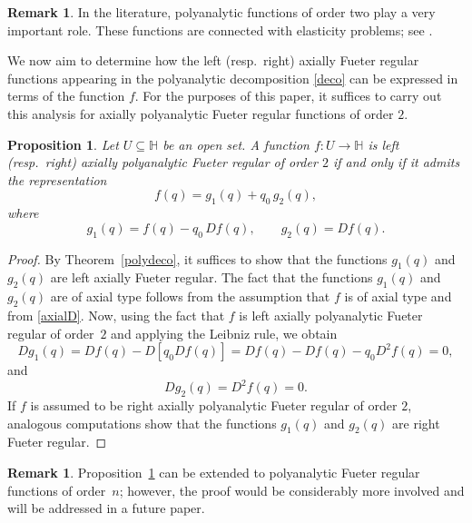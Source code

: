 \documentclass[reqno,11pt]{amsart}
\numberwithin{equation}{section}
\newtheorem{proposition}[theorem]{Proposition}
\theoremstyle{definition}
\newtheorem{remark}[theorem]{{\bf Remark}}
\begin{document}
\begin{remark}
In the literature, polyanalytic functions of order two play a very important role. These functions are connected with elasticity problems; see \cite{K1, M1}.
\end{remark}


We now aim to determine how the left (resp.\ right) axially Fueter regular functions appearing in the polyanalytic decomposition \eqref{deco} can be expressed in terms of the function $f$. For the purposes of this paper, it suffices to carry out this analysis for axially polyanalytic Fueter regular functions of order $2$.


\begin{proposition}
\label{decof}
Let $U \subseteq \mathbb{H}$ be an open set. A function $f \colon U \to \mathbb{H}$ is left (resp.\ right) axially polyanalytic Fueter regular of order $2$ if and only if it admits the representation
$$
f(q)= g_1(q)+ q_0\, g_2(q),
$$
where
\begin{equation}
	\label{g12}
	g_1(q)= f(q)- q_0\, Df(q),
	\qquad
	g_2(q)= Df(q).
\end{equation}
\end{proposition}
\begin{proof}
By Theorem~\ref{polydeco}, it suffices to show that the functions $g_1(q)$ and
$g_2(q)$ are left axially Fueter regular. The fact that the functions $g_1(q)$ and $g_2(q)$ are of axial type follows from the assumption that $f$ is of axial type and from \eqref{axialD}. Now, using the fact that $f$ is left axially polyanalytic Fueter regular of order~$2$ and applying the Leibniz rule, we obtain
$$
D g_1(q)= D f(q)- D\!\left[q_0 Df(q)\right]= Df(q)-Df(q)- q_0 D^2 f(q)= 0,
$$
and
$$
D g_2(q)= D^2 f(q)=0.
$$
If $f$ is assumed to be right axially polyanalytic Fueter regular of order $2$, analogous computations show that the functions $g_1(q)$ and $g_2(q)$ are right Fueter regular.
\end{proof}



\begin{remark}
Proposition~\ref{decof} can be extended to polyanalytic Fueter regular functions of order~$n$; however, the proof would be considerably more involved and will be addressed in a future paper.
\end{remark}
\end{document}

